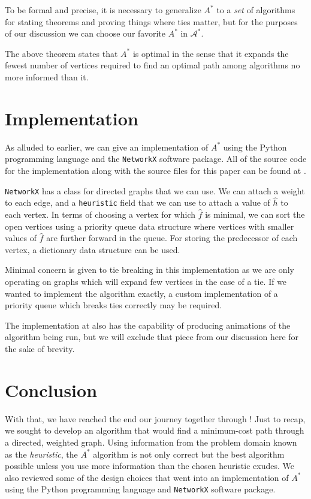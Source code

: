 \documentclass[letterpaper, 10pt]{article}
\theoremstyle{definition}
\theoremstyle{Algorithm}
\begin{document}
To be formal and precise, it is necessary to generalize $A^*$ 
to a \emph{set} of algorithms for stating theorems and 
proving things where ties matter, but for the purposes of
our discussion we can choose our favorite $A^*$ in $\mathcal{A}^*$.

The above theorem states that $A^*$ is optimal in the sense that
it expands the fewest number of vertices required to find
an optimal path among algorithms no more informed than it.



\section{Implementation} %

As alluded to earlier, we can give an implementation of $A^*$ using
the Python programming language and the \texttt{NetworkX} software
package. All of the source code for the implementation along with
the source files for this paper can be found at \cite{github}.

\texttt{NetworkX} has a 
class for directed graphs that we can use. We can attach
a weight to each edge, and a \texttt{heuristic} field 
that we can use to attach a value of $\hat{h}$ to each vertex.
In terms of choosing a vertex for which $\hat{f}$ is minimal,
we can sort the open vertices using a priority queue data 
structure where vertices with smaller values of $\hat{f}$
are further forward in the queue. For storing the 
predecessor of each vertex, a dictionary data structure can be
used.

Minimal concern is given to tie breaking in this implementation
as we are only operating on graphs which will expand few
vertices in the case of a tie. If we wanted to implement the
algorithm exactly, a custom implementation of a 
priority queue which breaks ties correctly may be required.

The implementation at \cite{github} also has the capability
of producing animations of the algorithm being run,
but we will exclude that piece from our discussion here
for the sake of brevity.


\section{Conclusion} %

With that, we have reached the end our journey together through
\cite{a_star}! Just to recap, we sought to develop an algorithm
that would find a minimum-cost path through a directed, weighted
graph. Using information from the problem domain known as the
\textit{heuristic}, the $A^*$ algorithm is not only correct
but the best algorithm possible unless you use more information
than the chosen heuristic exudes. We also reviewed some of 
the design choices that went into an implementation of
$A^*$ using the Python programming language and 
\texttt{NetworkX} software package.


\printbibliography
\end{document}
